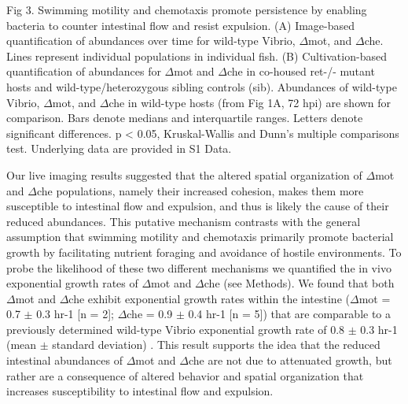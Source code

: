 Fig 3. Swimming motility and chemotaxis promote persistence by enabling bacteria to counter intestinal flow and resist expulsion. 
(A) Image-based quantification of abundances over time for wild-type Vibrio, $\Delta$mot, and $\Delta$che. Lines represent individual populations in individual fish. (B) Cultivation-based quantification of abundances for $\Delta$mot and $\Delta$che in co-housed ret-/- mutant hosts and wild-type/heterozygous sibling controls (sib). Abundances of wild-type Vibrio, $\Delta$mot, and $\Delta$che in wild-type hosts (from Fig 1A, 72 hpi) are shown for comparison. Bars denote medians and interquartile ranges. Letters denote significant differences. p < 0.05, Kruskal-Wallis and Dunn's multiple comparisons test. Underlying data are provided in S1 Data.

Our live imaging results suggested that the altered spatial organization of $\Delta$mot and $\Delta$che populations, namely their increased cohesion, makes them more susceptible to intestinal flow and expulsion, and thus is likely the cause of their reduced abundances. This putative mechanism contrasts with the general assumption that swimming motility and chemotaxis primarily promote bacterial growth by facilitating nutrient foraging and avoidance of hostile environments. To probe the likelihood of these two different mechanisms we quantified the in vivo exponential growth rates of $\Delta$mot and $\Delta$che (see Methods). We found that both $\Delta$mot and $\Delta$che exhibit exponential growth rates within the intestine ($\Delta$mot = 0.7 $\pm$ 0.3 hr-1 [n = 2]; $\Delta$che = 0.9 $\pm$ 0.4 hr-1 [n = 5]) that are comparable to a previously determined wild-type Vibrio exponential growth rate of 0.8 $\pm$ 0.3 hr-1 (mean $\pm$ standard deviation) \cite{wiles_host_2016}. This result supports the idea that the reduced intestinal abundances of $\Delta$mot and $\Delta$che are not due to attenuated growth, but rather are a consequence of altered behavior and spatial organization that increases susceptibility to intestinal flow and expulsion. 

